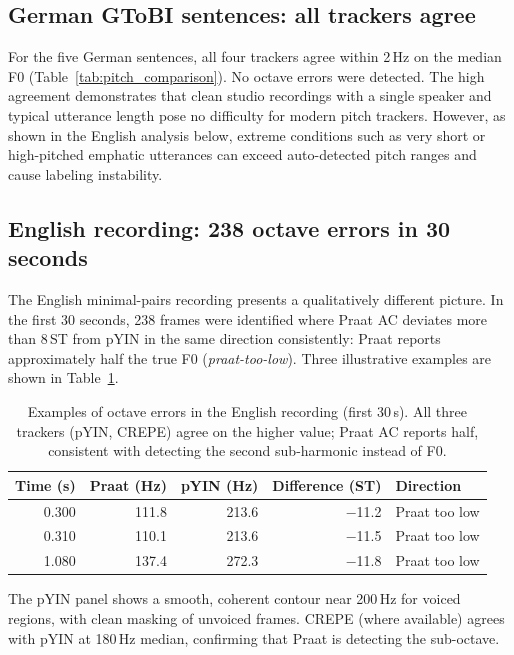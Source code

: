 \subsection{German GToBI sentences: all trackers agree}

For the five German sentences, all four trackers agree within 2\,Hz on the median F0 (Table~\ref{tab:pitch_comparison}). No octave errors were detected. The high agreement demonstrates that clean studio recordings with a single speaker and typical utterance length pose no difficulty for modern pitch trackers. However, as shown in the English analysis below, extreme conditions such as very short or high-pitched emphatic utterances can exceed auto-detected pitch ranges and cause labeling instability.

\subsection{English recording: 238 octave errors in 30 seconds}
\label{sec:english_octave}

The English minimal-pairs recording presents a qualitatively different picture. In the first 30 seconds, 238 frames were identified where Praat AC deviates more than 8\,ST from pYIN in the same direction consistently: Praat reports approximately half the true F0 (\emph{praat-too-low}). Three illustrative examples are shown in Table~\ref{tab:octave_examples}.

\begin{table}[h]
\centering
\caption{Examples of octave errors in the English recording (first 30\,s).
         All three trackers (pYIN, CREPE) agree on the higher value; Praat AC
         reports half, consistent with detecting the second sub-harmonic instead
         of F0.}
\label{tab:octave_examples}
\begin{tabular}{rrrrl}
\hline
Time (s) & Praat (Hz) & pYIN (Hz) & Difference (ST) & Direction \\
\hline
0.300 & 111.8 & 213.6 & $-$11.2 & Praat too low \\
0.310 & 110.1 & 213.6 & $-$11.5 & Praat too low \\
1.080 & 137.4 & 272.3 & $-$11.8 & Praat too low \\
\hline
\end{tabular}
\end{table}

The pYIN panel shows a smooth, coherent contour near 200\,Hz for voiced regions, with clean masking of unvoiced frames. CREPE (where available) agrees with pYIN at 180\,Hz median, confirming that Praat is detecting the sub-octave.

